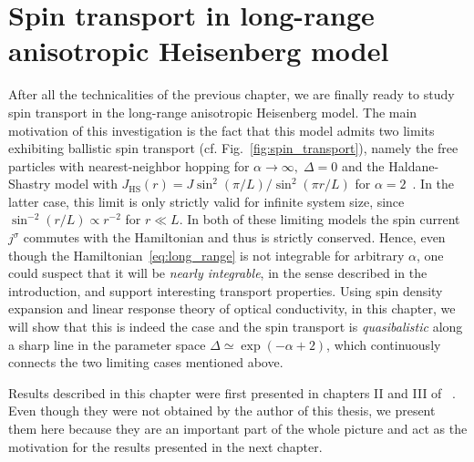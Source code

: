\chapter{Spin transport in long-range anisotropic Heisenberg model\label{chap:spin_transport}}
\thispagestyle{chapterBeginStyle}

After all the technicalities of the previous chapter, we are finally ready to study spin transport in
the long-range anisotropic Heisenberg model. The main motivation of this investigation is the fact that this model admits
two limits exhibiting ballistic spin transport (cf. Fig.~\ref{fig:spin_transport}), namely the free particles
with nearest-neighbor hopping for \(\alpha\to \infty,\; \Delta = 0\) and the Haldane-Shastry
model with \(J_{\mathrm{HS}}(r) = J \sin^2\left(\pi/L\right)/\sin^2\left(\pi r/L\right)\)
for \(\alpha = 2\)~\autocite{Haldane1988,Shastry1988}. In the latter case, this limit is only strictly valid
for infinite system size, since \(\sin^{-2}\left(r/L\right)\propto r^{-2}\) for \(r \ll L\).
In both of these limiting models the spin current
\(j^{\sigma}\) commutes with the Hamiltonian and thus is strictly conserved. Hence, even though
the Hamiltonian~\eqref{eq:long_range} is not integrable for arbitrary \(\alpha\), one could suspect
that it will be \textit{nearly integrable}, in the sense described in the introduction, and support
interesting transport properties. Using spin density expansion and linear response theory
of optical conductivity, in this chapter, we will show that this is indeed the case and the spin transport is \textit{quasibalistic} along a sharp
line in the parameter space \(\Delta \simeq \exp(- \alpha + 2)\), which continuously connects the two limiting
cases mentioned above.

Results described in this chapter were first presented in chapters II and III of ~\textcite{Mierzejewski2023}.
Even though they were not obtained by the author of this thesis, we present them here
because they are an important part of the whole picture and act as the motivation 
for the results presented in the next chapter.

